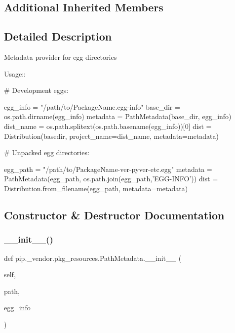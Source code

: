 \subsection*{Additional Inherited Members}


\subsection{Detailed Description}
\begin{DoxyVerb}Metadata provider for egg directories

Usage::

    # Development eggs:

    egg_info = "/path/to/PackageName.egg-info"
    base_dir = os.path.dirname(egg_info)
    metadata = PathMetadata(base_dir, egg_info)
    dist_name = os.path.splitext(os.path.basename(egg_info))[0]
    dist = Distribution(basedir, project_name=dist_name, metadata=metadata)

    # Unpacked egg directories:

    egg_path = "/path/to/PackageName-ver-pyver-etc.egg"
    metadata = PathMetadata(egg_path, os.path.join(egg_path,'EGG-INFO'))
    dist = Distribution.from_filename(egg_path, metadata=metadata)
\end{DoxyVerb}
 

\subsection{Constructor \& Destructor Documentation}
\mbox{\label{classpip_1_1__vendor_1_1pkg__resources_1_1PathMetadata_a8f309bcb3bd5080e389d889442e1cdb4}} 
\subsubsection{\texorpdfstring{\+\_\+\+\_\+init\+\_\+\+\_\+()}{\_\_init\_\_()}}
{\footnotesize\ttfamily def pip.\+\_\+vendor.\+pkg\+\_\+resources.\+Path\+Metadata.\+\_\+\+\_\+init\+\_\+\+\_\+ (\begin{DoxyParamCaption}\item[{}]{self,  }\item[{}]{path,  }\item[{}]{egg\+\_\+info }\end{DoxyParamCaption})}



